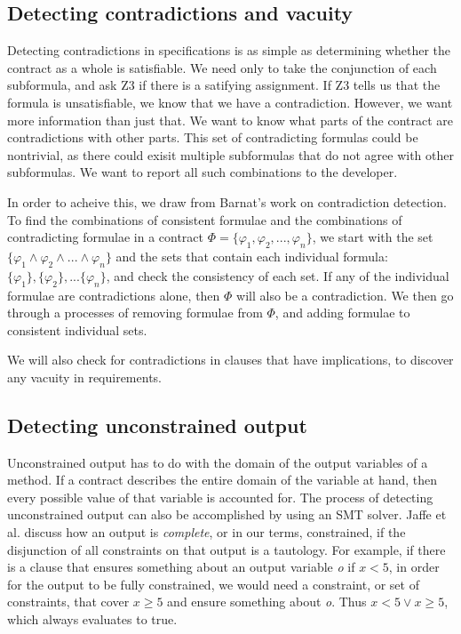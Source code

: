 \documentclass{article}
\begin{document}
\subsection{Detecting contradictions and vacuity}

Detecting contradictions in specifications is as simple as determining whether the contract as a whole is satisfiable.
We need only to take the conjunction of each subformula, and ask Z3 if there is a satifying assignment. If Z3 tells us that the
formula is unsatisfiable, we know that we have a contradiction. However, we want more information than just that. We
want to know what parts of the contract are contradictions with other parts. This set of contradicting formulas could be
nontrivial, as there could exisit multiple subformulas that do not agree with other subformulas. We want to report all
such combinations to the developer.

In order to acheive this, we draw from Barnat's \cite{barnat2016analysing} work on contradiction detection.
To find the combinations of consistent formulae and the combinations of contradicting formulae in a contract
\(\Phi = \{\varphi_{1}, \varphi_{2}, ..., \varphi_{n}\}\), we start with the set \(\{\varphi_{1} \land \varphi_{2} \land ... \land \varphi_{n}\} \)
and the sets that contain each individual formula: \(\{\varphi_{1}\}, \{\varphi_{2}\}, ... \{\varphi_{n}\} \), and check
the consistency of each set. If any of the individual formulae are contradictions alone, then \(\Phi\) will also be a contradiction.
We then go through a processes of removing formulae from \(\Phi\), and adding formulae to consistent individual sets.

We will also check for contradictions in clauses that have implications, to discover any vacuity in requirements.

\subsection{Detecting unconstrained output}

Unconstrained output has to do with the domain of the output variables of a method. If a contract describes the entire
domain of the variable at hand, then every possible value of that variable is accounted for. The process of detecting
unconstrained output can also be accomplished by using an SMT solver. Jaffe et al. \cite{jaffe1989completeness} discuss how
an output is \emph{complete}, or in our terms, constrained, if the disjunction of all constraints on that output is a
tautology. For example, if there is a clause that ensures something about an output variable {\it o} if \(x < 5\), in order
for the output to be fully constrained, we would need a constraint, or set of constraints, that cover \(x \geq 5\) and ensure 
something about {\it o}. Thus \(x < 5 \lor x \geq 5\), which always evaluates to true.
\end{document}
